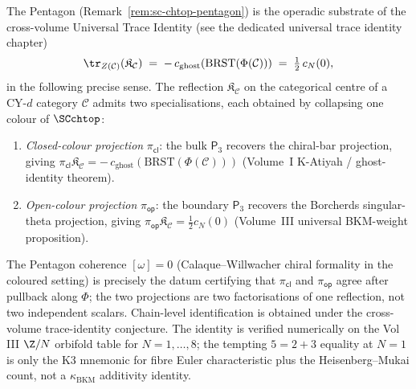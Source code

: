 \begin{remark}
\label{rem:pentagon-trace-identity}
The Pentagon (Remark~\ref{rem:sc-chtop-pentagon}) is the operadic
substrate of the cross-volume Universal Trace Identity (see the
dedicated universal trace identity chapter)
\[
 \tr_{Z(\mathcal C)}(\mathfrak K_{\mathcal C})
 \;=\; -\,c_{\mathrm{ghost}}(\mathrm{BRST}(\Phi(\mathcal C)))
 \;=\; \tfrac{1}{2}\,c_N(0),
\]
in the following precise sense. The reflection
$\mathfrak K_{\mathcal C}$ on the categorical centre of a CY-$d$
category $\mathcal C$ admits two specialisations, each obtained by
collapsing one colour of $\SCchtop$:
\begin{enumerate}[label=\textup{(\roman*)}]
\item \emph{Closed-colour projection} $\pi_{\mathsf{cl}}$: the bulk
$\mathsf P_3$ recovers the chiral-bar projection, giving
$\pi_{\mathsf{cl}} \mathfrak K_{\mathcal C} = -\,c_{\mathrm{ghost}}(\mathrm{BRST}(\Phi(\mathcal C)))$
(Volume~I K-Atiyah / ghost-identity theorem).
\item \emph{Open-colour projection} $\pi_{\mathsf{op}}$: the boundary
$\mathsf P_3$ recovers the Borcherds singular-theta projection,
giving $\pi_{\mathsf{op}} \mathfrak K_{\mathcal C} = \tfrac12 c_N(0)$
(Volume~III universal BKM-weight proposition).
\end{enumerate}
The Pentagon coherence $[\omega] = 0$ (Calaque--Willwacher chiral
formality in the coloured setting) is precisely the datum certifying
that $\pi_{\mathsf{cl}}$ and $\pi_{\mathsf{op}}$ agree after pullback
along $\Phi$; the two projections are two factorisations of one
reflection, not two independent scalars. Chain-level identification is
obtained under the cross-volume trace-identity conjecture.
The identity is verified numerically on the Vol III $\Z/N$ orbifold
table for $N = 1, \ldots, 8$; the tempting $5=2+3$ equality at $N=1$
is only the K3 mnemonic for fibre Euler characteristic plus the
Heisenberg--Mukai count, not a $\kappa_{\mathrm{BKM}}$ additivity
identity.
\end{remark}

